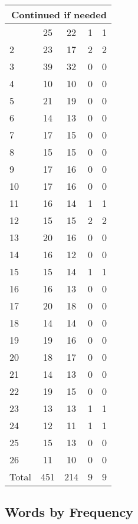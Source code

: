 \begin{center}
\begin{longtable}{l|c|c|c|c}
\hline \multicolumn{5}{|r|}{{Continued if needed}} \\ \hline
\endfoot 
1 & 25 & 22 & 1 & 1\\ \hline
2 & 23 & 17 & 2 & 2\\ \hline
3 & 39 & 32 & 0 & 0\\ \hline
4 & 10 & 10 & 0 & 0\\ \hline
5 & 21 & 19 & 0 & 0\\ \hline
6 & 14 & 13 & 0 & 0\\ \hline
7 & 17 & 15 & 0 & 0\\ \hline
8 & 15 & 15 & 0 & 0\\ \hline
9 & 17 & 16 & 0 & 0\\ \hline
10 & 17 & 16 & 0 & 0\\ \hline
11 & 16 & 14 & 1 & 1\\ \hline
12 & 15 & 15 & 2 & 2\\ \hline
13 & 20 & 16 & 0 & 0\\ \hline
14 & 16 & 12 & 0 & 0\\ \hline
15 & 15 & 14 & 1 & 1\\ \hline
16 & 16 & 13 & 0 & 0\\ \hline
17 & 20 & 18 & 0 & 0\\ \hline
18 & 14 & 14 & 0 & 0\\ \hline
19 & 19 & 16 & 0 & 0\\ \hline
20 & 18 & 17 & 0 & 0\\ \hline
21 & 14 & 13 & 0 & 0\\ \hline
22 & 19 & 15 & 0 & 0\\ \hline
23 & 13 & 13 & 1 & 1\\ \hline
24 & 12 & 11 & 1 & 1\\ \hline
25 & 15 & 13 & 0 & 0\\ \hline
26 & 11 & 10 & 0 & 0\\ \hline
\hline \hline
Total & 451 & 214 & 9 & 9



\end{longtable}
\end{center}

 
\subsection{Words by Frequency}

